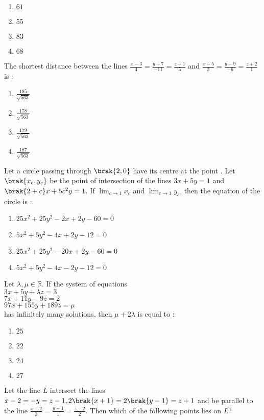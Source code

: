      \begin{enumerate}
     \item $61$ \item $55$ \item $83$ \item $68$
     \end{enumerate}
\item The shortest distance between the lines $\frac{x-3}{4}=\frac{y+7}{-11}=\frac{z-1}{5}$ and $\frac{x-5}{3}=\frac{y-9}{-6}=\frac{z+2}{1}$ is : \hfill{}
     \begin{enumerate}
     \item $\frac{185}{\sqrt{563}}$ 
     \item $\frac{178}{\sqrt{563}}$
     \item $\frac{179}{\sqrt{563}}$
     \item $\frac{187}{\sqrt{563}}$
     \end{enumerate}
\item Let a circle passing through $\brak{2,0}$ have its centre at the point . Let $\brak{x_c,y_c}$ be the point of intersection of the lines $3x+5y=1$ and $\brak{2+c}x+5c^2y=1.$ If $\displaystyle \lim_{c \to 1}x_c$ and $\displaystyle \lim_{c \to 1}y_c$, then the equation of the circle is : \hfill{}
     \begin{enumerate}
     \item $25x^2+25y^2-2x+2y-60=0$
     \item $5x^2+5y^2-4x+2y-12=0$
     \item $25x^2+25y^2-20x+2y-60=0$
     \item $5x^2+5y^2-4x-2y-12=0$
     \end{enumerate}
\item Let $\lambda,\mu \in \mathbb{R}.$ If the system of equations\\
	$3x+5y+\lambda z=3$\\
	$7x+11y-9z=2$\\
	$97x+155y+189z=\mu $\\
	has infinitely many solutions, then $\mu +2\lambda$ is equal to : \hfill{}
     \begin{enumerate}
     \item $25$ \item $22$ \item $24$ \item $27$
     \end{enumerate}
\item Let the line $L$ intersect the lines $x-2=-y=z-1,2\brak{x+1}=2\brak{y-1}=z+1$ and be parallel to the line $\frac{x-2}{3}=\frac{y-1}{1}=\frac{z-2}{2}$. Then which of the following points lies on $L$? \hfill{}
